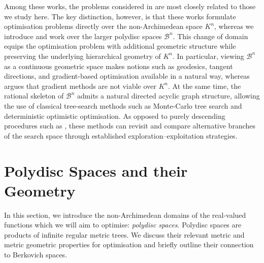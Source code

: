 \documentclass[10pt]{article}
\theoremstyle{definition}
\begin{document}
Among these works, the problems considered in \cite{BMP2025,martins2025learning} are most closely related to those we study here. The key distinction, however, is that these works formulate optimisation problems directly over the non-Archimedean space $K^n$, whereas we introduce and work over the larger polydisc spaces $\mathcal B^n$. This change of domain equips the optimisation problem with additional geometric structure while preserving the underlying hierarchical geometry of $K^n$. In particular, viewing $\mathcal B^n$ as a continuous geometric space makes notions such as geodesics, tangent directions, and gradient-based optimisation available in a natural way, whereas \cite[Section 3.3]{BMP2025} argues that gradient methods are not viable over $K^n$. At the same time, the rational skeleton of $\mathcal B^n$ admits a natural directed acyclic graph structure, allowing the use of classical tree-search methods such as Monte-Carlo tree search and deterministic optimistic optimisation.  As opposed to purely descending procedures such as \cite[Algorithm 1]{martins2025learning}, these methods can revisit and compare alternative branches of the search space through established exploration--exploitation strategies.





\section{Polydisc Spaces and their Geometry}
\label{sec:polydiscs}

In this section, we introduce the non-Archimedean domains of the real-valued functions which we will aim to optimise: \emph{polydisc spaces}.  Polydisc spaces are products of infinite regular metric trees.  We discuss their relevant metric and metric geometric properties for optimisation and briefly outline their connection to Berkovich spaces.
\end{document}
